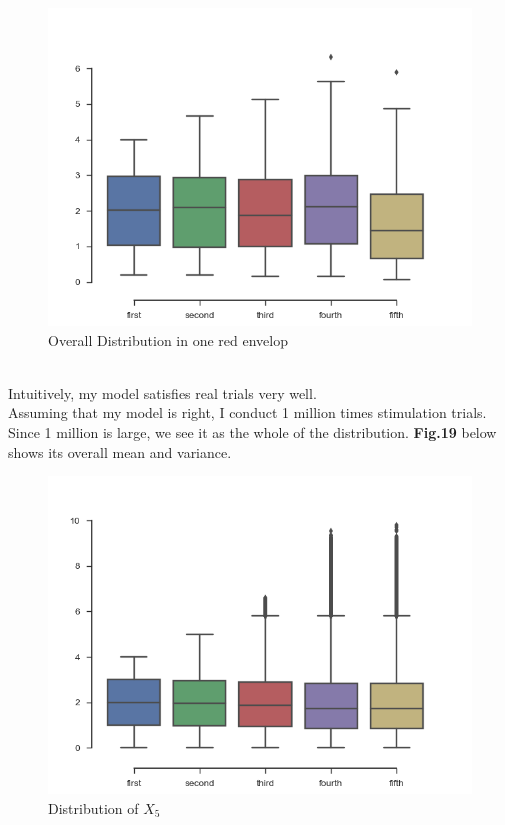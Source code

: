 \documentclass[10pt,journal]{IEEEtran}
\begin{document}
\begin{figure}[!ht]
	\centering
	\includegraphics[width=0.7\columnwidth,height=0.6\linewidth]{Posterior.png}
	\caption{Overall Distribution in one red envelop}
\end{figure}
\pagebreak
\\
Intuitively, my model satisfies real trials very well.
\\
Assuming that my model is right, I conduct 1 million times stimulation trials. Since 1 million is large, we see it as the whole of the distribution. \textbf{Fig.19} below shows its overall mean and variance.
\\
\begin{figure}[!ht]
	\centering
	\includegraphics[width=0.7\columnwidth,height=0.8\linewidth]{Stimulation.png}
	\caption{Distribution of \(X_5\)}
\end{figure}
\end{document}

